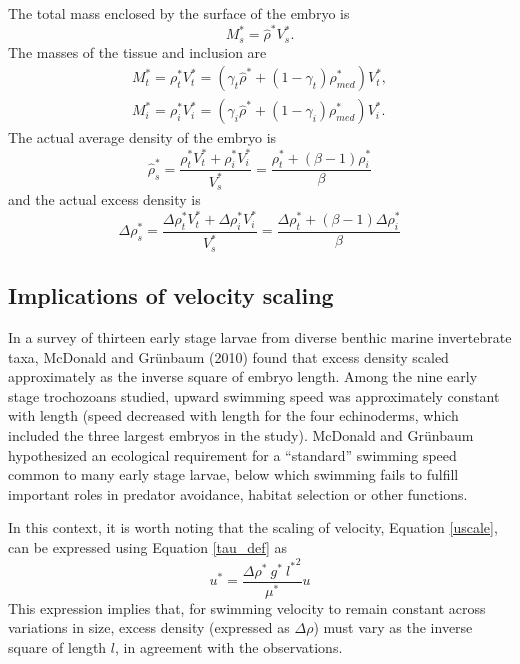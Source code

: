 \documentclass[10pt,a4paper]{article}
\def\non{\nonumber}
\begin{document}
The total mass enclosed by the surface of the embryo is 
\begin{equation*}
	M_s^* = \hat{\rho}^* V_s^*.
\end{equation*}
The masses of the tissue and inclusion are
\begin{eqnarray}\label{dens4}
	M_t^* = \rho_t^* V_t^* = (\gamma_t \hat{\rho}^* + (1 - \gamma_t) \rho_{med}^*) V_t^*, \non \\
	M_i^* = \rho_i^* V_i^* = (\gamma_i \hat{\rho}^* + (1 - \gamma_i) \rho_{med}^*) V_i^*.
\end{eqnarray}
The actual average density of the embryo is
\begin{equation}\label{dens5}
	\hat{\rho}_s^* = \frac{\rho_t^* V_t^* + \rho_i^* V_i^*}{V_s^*} = \frac{\rho_t^* + (\beta-1)\rho_i^*}{\beta}
\end{equation}
and the actual excess density is
\begin{equation}\label{dens6}
	\Delta \rho_s^* = \frac{\Delta \rho_t^* V_t^* + \Delta \rho_i^* V_i^*}{V_s^*} = \frac{\Delta \rho_t^* + (\beta-1)\Delta \rho_i^*}{\beta}
\end{equation}


\subsection{Implications of velocity scaling}
In a survey of thirteen early stage larvae from diverse benthic marine invertebrate taxa, McDonald and Gr\"unbaum (2010) found that excess density scaled approximately as the inverse square of embryo length. 
Among the nine early stage trochozoans studied, upward swimming speed was approximately constant with length (speed decreased with length for the four echinoderms, which included the three largest embryos in the study).
McDonald and Gr\"unbaum hypothesized an ecological requirement for a ``standard'' swimming speed common to many early stage larvae, below which swimming fails to fulfill important roles in predator avoidance, habitat selection or other functions.

In this context, it is worth noting that the scaling of velocity, Equation \ref{uscale}, can be expressed using Equation \ref{tau_def} as
\begin{equation}\label{key}
	u^* = \frac{\Delta \rho^* ~ g^* ~ {l^*}^2}{\mu^*} u 
\end{equation}
This expression implies that, for swimming velocity to remain constant across variations in size, excess density (expressed as $\Delta \rho$) must vary as the inverse square of length $l$, in agreement with the observations.
\end{document}
